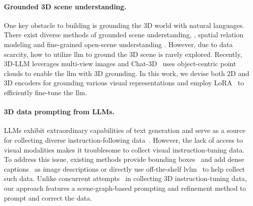 \paragraph{Grounded 3D scene understanding.}
One key obstacle to building \agent is grounding the 3D world with natural languages. There exist diverse methods of grounded scene understanding, \eg, spatial relation modeling \citep{zhao20213dvg,chen2022language,zhu20233d} and fine-grained open-scene understanding \citep{peng2023openscene,kerr2023lerf}. However, due to data scarcity, how to utilize \ac{llm} to ground the 3D scene is rarely explored. Recently, 3D-LLM \citep{hong20233d} leverages multi-view images and Chat-3D~\citep{wang2023chat} uses object-centric point clouds to enable the \ac{llm} with 3D grounding. In this work, we devise both 2D and 3D encoders for grounding various visual representations and employ LoRA~\citep{hu2022lora} to efficiently fine-tune the \ac{llm}.

\paragraph{3D data prompting from LLMs.} LLMs exhibit extraordinary capabilities of text generation and serve as a source for collecting diverse instruction-following data~\citep{wang2023self,alpaca,peng2023instruction}. However, the lack of access to visual modalities makes it troublesome to collect visual instruction-tuning data. To address this issue, existing methods provide bounding boxes~\citep{liu2023visual} and add dense captions~\citep{li2023mimic,liu2023aligning} as image descriptions or directly use off-the-shelf \ac{lvlm}~\citep{zhu2023chatgpt,luo2023scalable} to help collect such data. Unlike concurrent attempts~\citep{yin2023lamm,hong20233d,wang2023chat} in collecting 3D instruction-tuning data, our approach features a scene-graph-based prompting and refinement method to prompt and correct the data.
